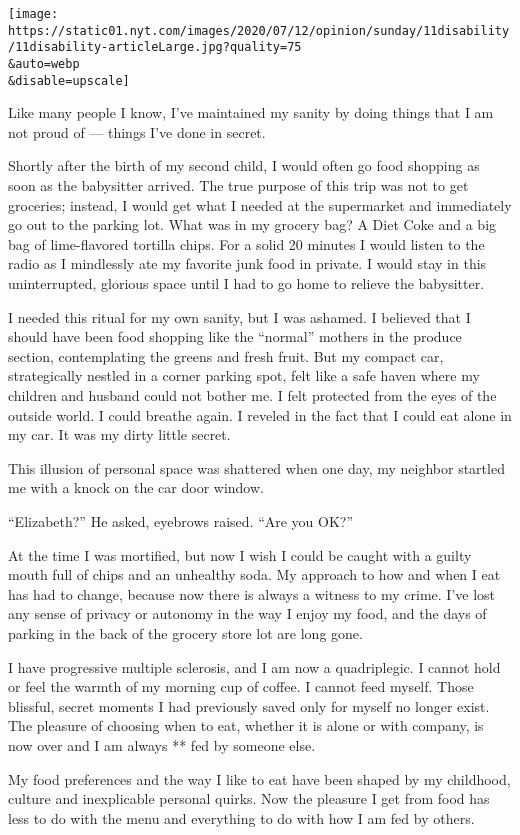 \texttt{[image: https://static01.nyt.com/images/2020/07/12/opinion/sunday/11disability/11disability-articleLarge.jpg?quality=75\\\&auto=webp\\\&disable=upscale]}

Like many people I know, I've maintained my sanity by doing things that
I am not proud of --- things I've done in secret.

Shortly after the birth of my second child, I would often go food
shopping as soon as the babysitter arrived. The true purpose of this
trip was not to get groceries; instead, I would get what I needed at the
supermarket and immediately go out to the parking lot. What was in my
grocery bag? A Diet Coke and a big bag of lime-flavored tortilla chips.
For a solid 20 minutes I would listen to the radio as I mindlessly ate
my favorite junk food in private. I would stay in this uninterrupted,
glorious space until I had to go home to relieve the babysitter.

I needed this ritual for my own sanity, but I was ashamed. I believed
that I should have been food shopping like the ``normal'' mothers in the
produce section, contemplating the greens and fresh fruit. But my
compact car, strategically nestled in a corner parking spot, felt like a
safe haven where my children and husband could not bother me. I felt
protected from the eyes of the outside world. I could breathe again. I
reveled in the fact that I could eat alone in my car. It was my dirty
little secret.

This illusion of personal space was shattered when one day, my neighbor
startled me with a knock on the car door window.

``Elizabeth?'' He asked, eyebrows raised. ``Are you OK?''

At the time I was mortified, but now I wish I could be caught with a
guilty mouth full of chips and an unhealthy soda. My approach to how and
when I eat has had to change, because now there is always a witness to
my crime. I've lost any sense of privacy or autonomy in the way I enjoy
my food, and the days of parking in the back of the grocery store lot
are long gone.

I have progressive multiple sclerosis, and I am now a quadriplegic. I
cannot hold or feel the warmth of my morning cup of coffee. I cannot
feed myself. Those blissful, secret moments I had previously saved only
for myself no longer exist. The pleasure of choosing when to eat,
whether it is alone or with company, is now over and I am always ** fed
by someone else.

My food preferences and the way I like to eat have been shaped by my
childhood, culture and inexplicable personal quirks. Now the pleasure I
get from food has less to do with the menu and everything to do with how
I am fed by others.

